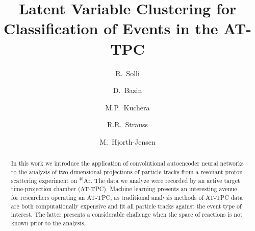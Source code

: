 \documentclass[review,number,sort&compress]{elsarticle}
\begin{document}
\begin{frontmatter}


\title{Latent Variable Clustering for Classification of Events in the AT-TPC}


\author{R.~Solli}
\address{Expert Analytics AS, Tordenskiolds gate 6, 0160, Oslo, Norway}
\address{Department of Physics, University of Oslo, POB 1048 Oslo, N-0316 Oslo, Norway}

\author{D.~Bazin}
\address{Department of Physics and Astronomy and Facility for Rare Ion Beams and National Superconducting Cyclotron Facility, Michigan State University, East Lansing, MI 48824, USA}
\author{M.P.~Kuchera}
\address{Department of Physics, Davidson College, Davidson, North Carolina, USA}
\author{R.R.~Strauss}
\address{Department of Mathematics and Computer Science, Davidson College, Davidson, North Carolina, USA}

\author{M.~Hjorth-Jensen}
\address{Department of Physics and Astronomy and Facility for Rare Ion Beams and National Superconducting Cyclotron Facility, Michigan State University, East Lansing, MI 48824, USA}
\address{Department of Physics and Center for Computing in Science Education, University of Oslo, POB 1048 Oslo, N-0316 Oslo, Norway}


\begin{abstract}
In this work we introduce the application of convolutional autoencoder neural networks to the analysis of two-dimensional projections of particle tracks from a resonant proton scattering experiment on ${}^{46}$Ar. 
The data we analyze were recorded by an active target time-projection chamber (AT-TPC). Machine learning presents an interesting avenue for researchers operating an AT-TPC, as traditional analysis methods of AT-TPC data are both computationally expensive and fit all particle tracks against the event type of interest. The latter presents a considerable challenge when the space of reactions is not known prior to the analysis. 


\end{abstract}
\end{frontmatter}
\end{document}
